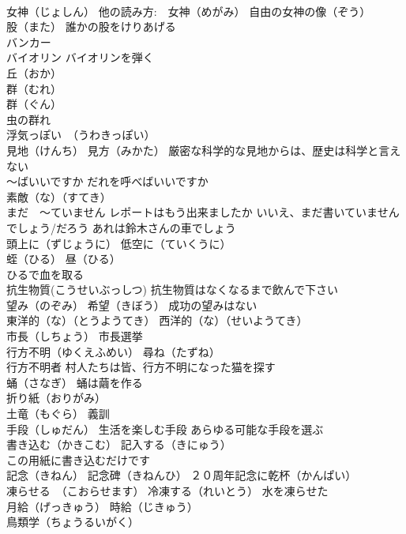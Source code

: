 \documentclass[8pt]{extreport}
\begin{document}
\begin{CJK}{UTF8}{min}
\\	女神（じょしん） 他の読み方:　女神（めがみ） 自由の女神の像（ぞう）
\\	股（また） 誰かの股をけりあげる
\\	バンカー
\\	バイオリン バイオリンを弾く
\\	丘（おか）
\\	群（むれ）
\\	群（ぐん）
\\	虫の群れ
\\	浮気っぽい　（うわきっぽい）
\\	見地（けんち） 見方（みかた） 厳密な科学的な見地からは、歴史は科学と言えない
\\	～ばいいですか だれを呼べばいいですか
\\	素敵（な）（すてき）
\\	まだ　～ていません レポートはもう出来ましたか いいえ、まだ書いていません
\\	でしょう/だろう あれは鈴木さんの車でしょう
\\	頭上に（ずじょうに） 低空に（ていくうに）
\\	蛭（ひる） 昼（ひる）
\\	ひるで血を取る
\\	抗生物質(こうせいぶっしつ) 抗生物質はなくなるまで飲んで下さい
\\	望み（のぞみ） 希望（きぼう） 成功の望みはない
\\	東洋的（な）（とうようてき） 西洋的（な）（せいようてき）
\\	市長（しちょう） 市長選挙
\\	行方不明（ゆくえふめい） 尋ね（たずね）
\\	行方不明者 村人たちは皆、行方不明になった猫を探す
\\	蛹（さなぎ） 蛹は繭を作る
\\	折り紙（おりがみ）
\\	土竜（もぐら） 義訓
\\	手段（しゅだん） 生活を楽しむ手段 あらゆる可能な手段を選ぶ
\\	書き込む（かきこむ） 記入する（きにゅう）
\\	この用紙に書き込むだけです
\\	記念（きねん） 記念碑（きねんひ） ２０周年記念に乾杯（かんぱい）
\\	凍らせる　（こおらせます） 冷凍する（れいとう） 水を凍らせた
\\	月給（げっきゅう） 時給（じきゅう）
\\	鳥類学（ちょうるいがく）

\end{CJK}
\end{document}
